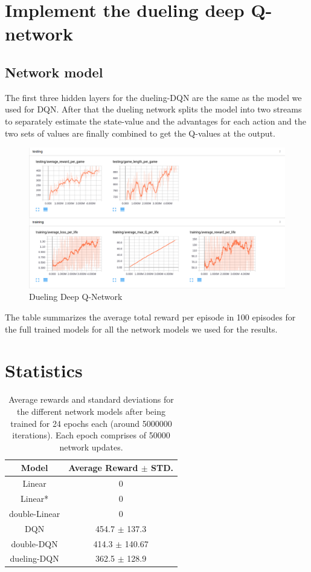 \documentclass{article}
\begin{document}
\section*{Implement the dueling deep Q-network}
\subsection*{Network model}
The first three hidden layers for the dueling-DQN are the same as the model we used for DQN. After that the dueling network splits the model into two streams to separately estimate the state-value and the advantages for each action and the two sets of values are finally combined to get the Q-values at the output.

\begin{figure}[h]
\centering

\includegraphics[scale=0.3]{duel.png}
\caption{Dueling Deep Q-Network}
\end{figure}

The table summarizes the average total reward per episode in 100 episodes for the full trained models for all the network models we used for the results.

\section*{Statistics}
\begin{table}

\begin{center}
 \begin{tabular}{||c | c||} 
 \hline
 Model & Average Reward $\pm$ STD. \\ [0.5ex] 
 \hline\hline
 Linear & 0 \\ 
 \hline
 Linear* & 0 \\
 \hline
 double-Linear & 0 \\
 \hline
 DQN & 454.7 $\pm$ 137.3 \\
 \hline
 double-DQN & 414.3 $\pm$ 140.67 \\  
 \hline
 dueling-DQN & 362.5 $\pm$ 128.9 \\ 
 \hline
\end{tabular}
\end{center}
\caption{Average rewards and standard deviations for the different network models after being trained for 24 epochs each (around 5000000 iterations). Each epoch comprises of 50000 network updates.}
\end{table}
\end{document}
